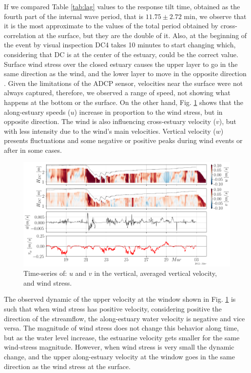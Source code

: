 \documentclass[tesis.tex]{subfiles}
\begin{document}
    If we compared Table \ref{tab:lag} values to the response tilt time, obtained as the fourth part of the internal wave period, that is $11.75 \pm 2.72$ min, we observe that it is the most approximate to the values of the total period obtained by cross-correlation at the surface, but they are the double of it. Also, at the beginning of the event by visual inspection DC4 takes 10 minutes to start changing which, considering that DC is at the center of the estuary, could be the correct value.\\

    Surface wind stress over the closed estuary causes the upper layer to go in the same direction as the wind, and the lower layer to move in the opposite direction \citep{Katopodes2018}. Given the limitations of the ADCP sensor, velocities near the surface were not always captured, therefore, we observed a range of speed, not showing what happens at the bottom or the surface. On the other hand, Fig. \ref{fig:vels} shows that the along-estuary speeds ($u$) increase in proportion to the wind stress, but in opposite direction. The wind is also influencing cross-estuary velocity ($v$), but with less intensity due to the wind's main velocities. Vertical velocity ($w$) presents fluctuations and some negative or positive peaks during wind events or after in some cases. \\

    \begin{figure}[h!]
        \centering
        \includegraphics[width=\textwidth]{Imagenes/vels.png}
        \caption{Time-series of: $u$ and $v$ in the vertical, averaged vertical velocity, and wind stress.}
        \label{fig:vels}
    \end{figure}
    
    The observed dynamic of the upper velocity at the window shown in Fig. \ref{fig:vels} is such that when wind stress has positive velocity, considering positive the direction of the streamflow, the along-estuary water velocity is negative and vice versa. The magnitude of wind stress does not change this behavior along time, but as the water level increase, the estuarine velocity gets smaller for the same wind-stress magnitude. However, when wind stress is very small the dynamic change, and the upper along-estuary velocity at the window goes in the same direction as the wind stress at the surface. \\
    
\end{document}
